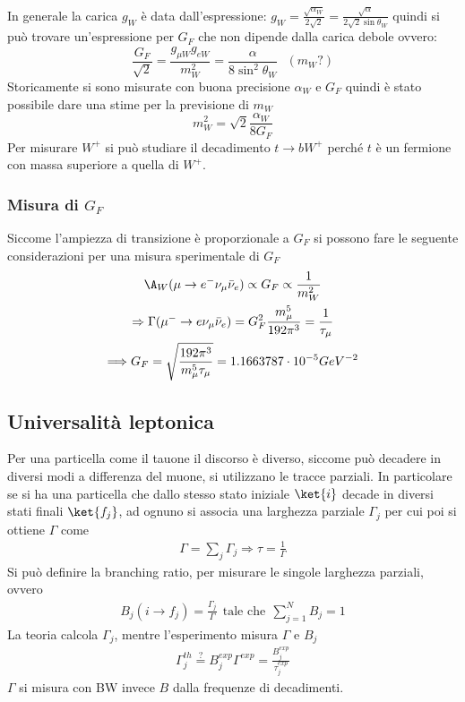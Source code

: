 \documentclass[12pt]{book}
\begin{document}
In generale la carica $g_W$ è data dall'espressione: $g_W= \frac{ \sqrt{ \alpha _W}}{2 \sqrt{2}} = \frac{\sqrt{\alpha}}{2 \sqrt{2} \sin \theta_W}$ quindi si può trovare un'espressione per $G_F$ che non dipende dalla carica debole ovvero:
\begin{equation}
	\frac{G_F}{\sqrt{2}} = \frac{g_{\mu W}g_{eW}}{m_W^2} = \frac{\alpha}{8 \sin^2 \theta_W} \ \ \ (m_W?)
\end{equation}
Storicamente si sono misurate con buona precisione $\alpha_W$ e $G_F$ quindi è stato possibile dare una stime per la previsione di $m_W$
\begin{equation}
	m^2_W = \sqrt{2} \frac{\alpha_W}{8 G_F}
\end{equation}
Per misurare $W^+$ si può studiare il decadimento $t \rightarrow b W^+$ perché $t$ è un fermione con massa superiore a quella di $W^+$.

\subsubsection{Misura di $G_F$}
Siccome l'ampiezza di transizione è proporzionale a $G_F$ si possono fare le seguente considerazioni per una misura sperimentale di $G_F$
\begin{gather}
	\A_W ( \mu \rightarrow e^- \nu_\mu \bar \nu_e ) \propto G_F \propto \frac{1}{m_W^2}\\
	\Rightarrow \Gamma ( \mu^- \rightarrow e \nu_\mu \bar \nu_e) = G_F^2 \frac{m_\mu^5}{192 \pi^3} = \frac{1}{\tau_\mu}\\
	\Longrightarrow G_F = \sqrt{\frac{192 \pi^3}{m_\mu^5 \tau_\mu}} = 1.1663787 \cdot 10^{-5} GeV^{-2}
\end{gather}

\newpage
\subsection{Universalità leptonica}
Per una particella come il tauone il discorso è diverso, siccome può decadere in diversi modi a differenza del muone, si utilizzano le tracce parziali. In particolare se si ha una particella che dallo stesso stato iniziale $\ket{i}$ decade in diversi stati finali $\ket{f_j}$, ad ognuno si associa una larghezza parziale $\Gamma_j$ per cui poi si ottiene $\Gamma$ come
\begin{gather}
	\Gamma = \sum_j \Gamma_j \Rightarrow \tau = \frac{1}{\Gamma}
\end{gather}
Si può definire la branching ratio, per misurare le singole larghezza parziali, ovvero
\begin{gather}
	B_j (i\rightarrow f_j) = \frac{\Gamma_j}{\Gamma} \ \ \text{tale che} \ \ \sum_{j=1}^N B_j=1
\end{gather}
La teoria calcola $\Gamma_j$, mentre l'esperimento misura $\Gamma$ e $B_j$
\begin{gather}
	\Gamma_j^{th} \overset{?}{=} B_j^{exp} \Gamma^{exp} = \frac{B_j^{exp}}{\tau_j^{exp}}
\end{gather}
$\Gamma$ si misura con BW invece $B$ dalla frequenze di decadimenti.  
\end{document}
